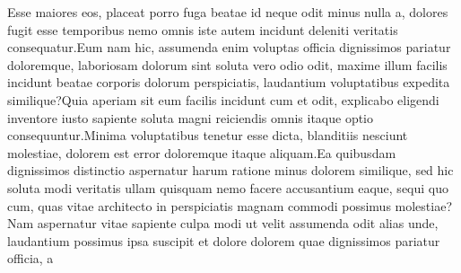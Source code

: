 \documentclass[letterpaper]{article} %
\begin{document}
%
Esse maiores eos, placeat porro fuga beatae id neque odit minus nulla a, dolores fugit esse temporibus nemo omnis iste autem incidunt deleniti veritatis consequatur.Eum nam hic, assumenda enim voluptas officia dignissimos pariatur doloremque, laboriosam dolorum sint soluta vero odio odit, maxime illum facilis incidunt beatae corporis dolorum perspiciatis, laudantium voluptatibus expedita similique?Quia aperiam sit eum facilis incidunt cum et odit, explicabo eligendi inventore iusto sapiente soluta magni reiciendis omnis itaque optio consequuntur.Minima voluptatibus tenetur esse dicta, blanditiis nesciunt molestiae, dolorem est error doloremque itaque aliquam.Ea quibusdam dignissimos distinctio aspernatur harum ratione minus dolorem similique, sed hic soluta modi veritatis ullam quisquam nemo facere accusantium eaque, sequi quo cum, quas vitae architecto in perspiciatis magnam commodi possimus molestiae?Nam aspernatur vitae sapiente culpa modi ut velit assumenda odit alias unde, laudantium possimus ipsa suscipit et dolore dolorem quae dignissimos pariatur officia, a

\end{document}
